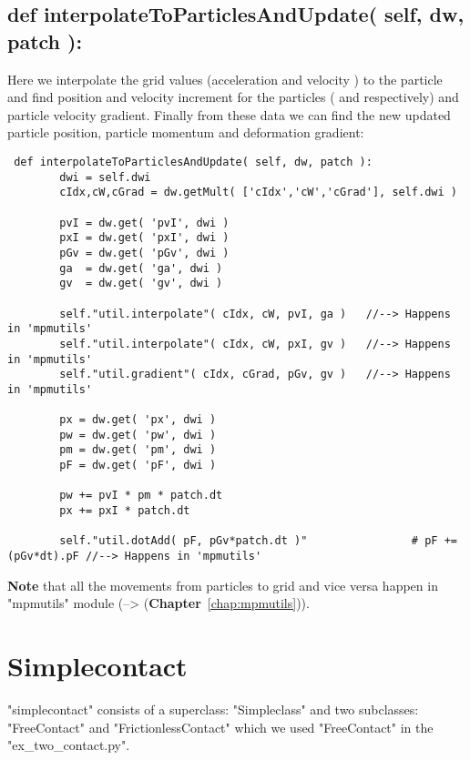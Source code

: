 \section{ def interpolateToParticlesAndUpdate( self, dw, patch ): }
Here we interpolate the grid values (acceleration  and velocity ) to the particle and find position and velocity increment for the particles ( and  respectively) and particle velocity gradient. Finally from these data we can find the new updated particle position, particle momentum and deformation gradient:

\begin{lstlisting}
 def interpolateToParticlesAndUpdate( self, dw, patch ):         
        dwi = self.dwi
        cIdx,cW,cGrad = dw.getMult( ['cIdx','cW','cGrad'], self.dwi )

        pvI = dw.get( 'pvI', dwi )
        pxI = dw.get( 'pxI', dwi )
        pGv = dw.get( 'pGv', dwi )
        ga  = dw.get( 'ga', dwi )
        gv  = dw.get( 'gv', dwi )
        
        self."util.interpolate"( cIdx, cW, pvI, ga )   //--> Happens in 'mpmutils'
        self."util.interpolate"( cIdx, cW, pxI, gv )   //--> Happens in 'mpmutils'
        self."util.gradient"( cIdx, cGrad, pGv, gv )   //--> Happens in 'mpmutils'
        
        px = dw.get( 'px', dwi )
        pw = dw.get( 'pw', dwi )
        pm = dw.get( 'pm', dwi )        
        pF = dw.get( 'pF', dwi )
        
        pw += pvI * pm * patch.dt
        px += pxI * patch.dt
        
        self."util.dotAdd( pF, pGv*patch.dt )"                # pF += (pGv*dt).pF //--> Happens in 'mpmutils'
\end{lstlisting}

\textbf{Note} that all the movements from particles to grid and vice versa happen in "mpmutils" module (--> (\textbf{Chapter}~\ref{chap:mpmutils})).




\chapter{Simplecontact}
\label{chap:simplecontact}
"simplecontact" consists of a superclass: "Simpleclass" and two subclasses: "FreeContact" and "FrictionlessContact" which we used "FreeContact" in the "ex\_two\_contact.py".
